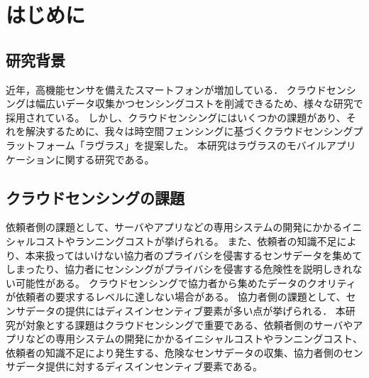 \chapter{はじめに}
\thispagestyle{myheadings}


\section{研究背景}
\label{sec:schedule}

近年，高機能センサを備えたスマートフォンが増加している．
クラウドセンシングは幅広いデータ収集かつセンシングコストを削減できるため、様々な研究で採用されている。
しかし、クラウドセンシングにはいくつかの課題があり、それを解決するために、我々は時空間フェンシングに基づくクラウドセンシングプラットフォーム「ラヴラス」を提案した。
本研究はラヴラスのモバイルアプリケーションに関する研究である。

\section{クラウドセンシングの課題}
依頼者側の課題として、サーバやアプリなどの専用システムの開発にかかるイニシャルコストやランニングコストが挙げられる。
また、依頼者の知識不足により、本来扱ってはいけない協力者のプライバシを侵害するセンサデータを集めてしまったり、協力者にセンシングがプライバシを侵害する危険性を説明しきれない可能性がある。
クラウドセンシングで協力者から集めたデータのクオリティが依頼者の要求するレベルに達しない場合がある。
協力者側の課題として、センサデータの提供にはディスインセンティブ要素が多い点が挙げられる．
本研究が対象とする課題はクラウドセンシングで重要である、依頼者側のサーバやアプリなどの専用システムの開発にかかるイニシャルコストやランニングコスト、依頼者の知識不足により発生する、危険なセンサデータの収集、協力者側のセンサデータ提供に対するディスインセンティブ要素である。

